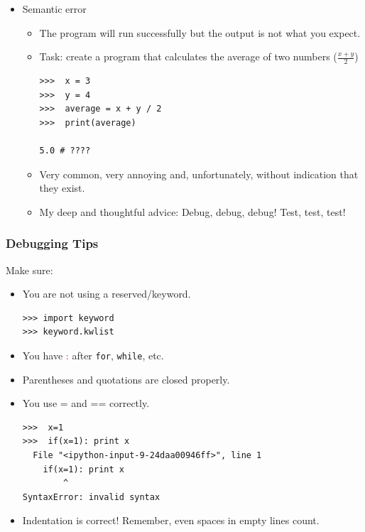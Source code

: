 \documentclass[xcolor=x11names,compress]{beamer}
\renewcommand{\(}{\begin{columns}}
\renewcommand{\)}{\end{columns}}
\newcommand{\<}[1]{\begin{column}{#1}}
\renewcommand{\>}{\end{column}}
\begin{document}
\begin{frame}[fragile]
\begin{itemize}
  \item \textcolor{myred}{Semantic error}
  \begin{itemize}[<+->]
  	\item The program will run successfully but the output is not what you expect.
  	\item Task: create a program that calculates the average of two numbers ($\frac{x+y}{2}$)
  	
  	\begin{verbatim}
>>>  x = 3
>>>  y = 4
>>>	 average = x + y / 2
>>>	 print(average)

5.0 # ????
  	\end{verbatim}
  	\item Very common, very annoying and, unfortunately, without indication that they exist.
	\item My deep and thoughtful advice: Debug, debug, debug! Test, test, test!
 \end{itemize}
  \end{itemize}
\end{frame}

\begin{frame}[fragile]
\frametitle{Debugging Tips}
Make sure:
\begin{itemize}
\item You are not using a reserved/keyword. 

\begin{verbatim}
>>> import keyword
>>> keyword.kwlist
\end{verbatim}

\pause

\item You have \textcolor{red}{:} after \texttt{for}, \texttt{while}, etc. \pause

\item Parentheses and quotations are closed properly. \pause

\item You use = and == correctly. \pause

\begin{footnotesize}
\begin{verbatim}
>>>  x=1
>>>  if(x=1): print x
  File "<ipython-input-9-24daa00946ff>", line 1
    if(x=1): print x
        ^
SyntaxError: invalid syntax
\end{verbatim}
	
\end{footnotesize}

\item Indentation is correct! Remember, even spaces in empty lines count.
\end{itemize}
\end{frame}
\end{document}

